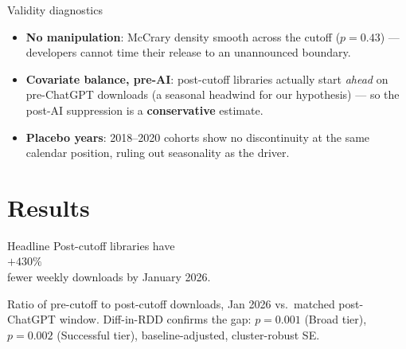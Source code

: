 \documentclass[10pt, aspectratio=169]{beamer}
\begin{document}
\begin{frame}{Validity diagnostics}
    \begin{itemize}
        \item \textbf{No manipulation}: McCrary density smooth across the cutoff ($p = 0.43$) --- developers cannot time their release to an unannounced boundary.
        \item \textbf{Covariate balance, pre-AI}: post-cutoff libraries actually start \emph{ahead} on pre-ChatGPT downloads (a seasonal headwind for our hypothesis) --- so the post-AI suppression is a \textbf{conservative} estimate.
        \item \textbf{Placebo years}: 2018--2020 cohorts show no discontinuity at the same calendar position, ruling out seasonality as the driver.
    \end{itemize}
\end{frame}

\section{Results}

\begin{frame}{Headline}
    \centering
    \vspace{0.3em}
    {\color{DarkSteel}\fontsize{22}{26}\selectfont Post-cutoff libraries have}\\[0.5em]
    {\color{AccentRed}\fontsize{96}{110}\selectfont\bfseries $+430\%$}\\[0.6em]
    {\color{DarkSteel}\fontsize{22}{26}\selectfont fewer weekly downloads by January 2026.}\\[1.2em]
    \begin{minipage}{0.8\textwidth}
        \centering
        \footnotesize
        Ratio of pre-cutoff to post-cutoff downloads, Jan 2026 vs.\ matched post-ChatGPT window. Diff-in-RDD confirms the gap: $p = 0.001$ (Broad tier), $p = 0.002$ (Successful tier), baseline-adjusted, cluster-robust SE.
    \end{minipage}
\end{frame}
\end{document}
